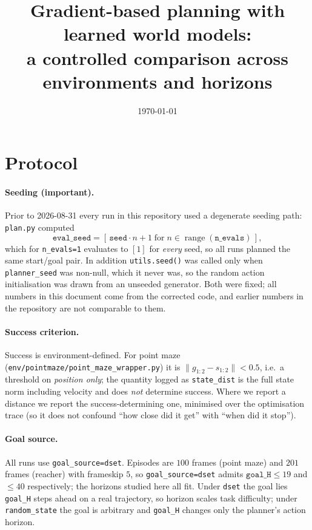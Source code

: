 \documentclass[11pt]{article}
\title{Gradient-based planning with learned world models:\\
a controlled comparison across environments and horizons}
\author{}
\date{\today}
\begin{document}
\maketitle

\section{Protocol}

\paragraph{Seeding (important).} Prior to 2026-08-31 every run in this
repository used a degenerate seeding path: \texttt{plan.py} computed
\[
  \texttt{eval\_seed} = [\,\texttt{seed} \cdot n + 1 \;\text{for}\; n \in \operatorname{range}(\texttt{n\_evals})\,],
\]
which for \texttt{n\_evals=1} evaluates to $[1]$ for \emph{every} seed, so all
runs planned the same start/goal pair. In addition \texttt{utils.seed()} was
called only when \texttt{planner\_seed} was non-null, which it never was, so
the random action initialisation was drawn from an unseeded generator. Both
were fixed; all numbers in this document come from the corrected code, and
earlier numbers in the repository are not comparable to them.

\paragraph{Success criterion.} Success is environment-defined. For point maze
(\texttt{env/pointmaze/point\_maze\_wrapper.py}) it is
$\lVert g_{1:2} - s_{1:2}\rVert < 0.5$, i.e.\ a threshold on \emph{position
only}; the quantity logged as \texttt{state\_dist} is the full state norm
including velocity and does \emph{not} determine success. Where we report a
distance we report the success-determining one, minimised over the
optimisation trace (so it does not confound ``how close did it get'' with
``when did it stop'').

\paragraph{Goal source.} All runs use \texttt{goal\_source=dset}. Episodes are
$100$ frames (point maze) and $201$ frames (reacher) with frameskip $5$, so
\texttt{goal\_source=dset} admits $\texttt{goal\_H} \le 19$ and $\le 40$
respectively; the horizons studied here all fit. Under \texttt{dset} the goal
lies \texttt{goal\_H} steps ahead on a real trajectory, so horizon scales task
difficulty; under \texttt{random\_state} the goal is arbitrary and
\texttt{goal\_H} changes only the planner's action horizon.
\end{document}
